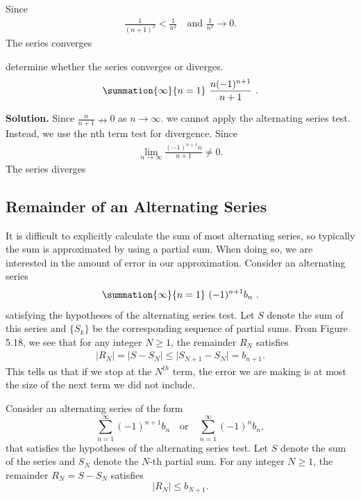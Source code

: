 \documentclass{report}
\begin{document}
    \bigbreak \noindent 
    Since
    \begin{align*}
        \frac{1}{(n+1)^{2}} < \frac{1}{n^{2}} \quad \text{and } \frac{1}{n^{2}} \to 0
    .\end{align*}
    The series converges

   \bigbreak \noindent 
  \begin{eg}
      determine whether the series converges or diverges. 
      \begin{align*}
          \summation{\infty}{n=1}\ \frac{n(-1)^{n+1}}{n+1}\ 
      .\end{align*}
   \end{eg}
   \bigbreak \noindent 
   \textbf{Solution.} Since $\frac{n}{n+1} \nrightarrow 0$ as $n \rightarrow \infty$.  we cannot apply the alternating series test. Instead, we use the nth term test for divergence. Since
   \begin{align*}
       \lim\limits_{n \to \infty}{\frac{(-1)^{n+1}n}{n+1}} \ne 0 
   .\end{align*}
   \bigbreak \noindent 
   The series diverges

   \pagebreak
   \subsection*{Remainder of an Alternating Series}
   \bigbreak \noindent 
    It is difficult to explicitly calculate the sum of most alternating series, so typically the sum is approximated by using a partial sum. When doing so, we are interested in the amount of error in our approximation. Consider an alternating series
    \begin{align*}
        \summation{\infty}{n=1}\ (-1)^{n+1}b_{n}\ 
    .\end{align*}
    \bigbreak \noindent 
    satisfying the hypotheses of the alternating series test. Let \( S \) denote the sum of this series and \( \{S_k\} \) be the corresponding sequence of partial sums. From Figure 5.18, we see that for any integer \( N \geq 1 \), the remainder \( R_N \) satisfies
    \begin{align*}
        \lvert R_N \rvert = \lvert S - S_N \rvert \leq \lvert S_{N+1} - S_N \rvert = b_{n+1} 
    .\end{align*}
    \bigbreak \noindent 
    This tells us that if we stop at the $N^{th}$ term, the error we are making is at most the size of the next term we did not include.
    \bigbreak \noindent 
    \begin{thrm}[Remainders in Alternating Series]
        Consider an alternating series of the form
\[
\sum_{n=1}^{\infty} (-1)^{n+1} b_n \quad \text{or} \quad \sum_{n=1}^{\infty} (-1)^n b_n,
\]
that satisfies the hypotheses of the alternating series test. Let \( S \) denote the sum of the series and \( S_N \) denote the \( N \)-th partial sum. For any integer \( N \geq 1 \), the remainder \( R_N = S - S_N \) satisfies
\[
\lvert R_N \rvert \leq b_{N+1}.
\]

    \end{thrm}
\end{document}
